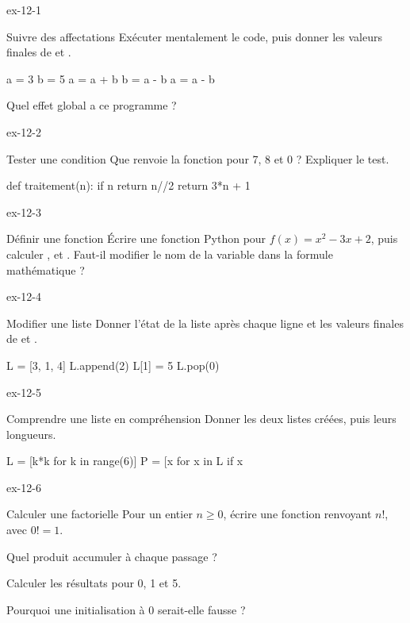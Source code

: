 \begin{blocLivre}{ex-12-1}
\begin{exercice}[1]{Suivre des affectations}
Exécuter mentalement le code, puis donner les valeurs finales de  et .
\begin{python}
a = 3
b = 5
a = a + b
b = a - b
a = a - b
\end{python}
Quel effet global a ce programme ?
\end{exercice}
\end{blocLivre}
\begin{blocLivre}{ex-12-2}
\begin{exercice}[1]{Tester une condition}
Que renvoie la fonction pour 7, 8 et 0 ? Expliquer le test.
\begin{python}
def traitement(n):
    if n %
        return n//2
    return 3*n + 1
\end{python}
\end{exercice}
\end{blocLivre}
\begin{blocLivre}{ex-12-3}
\begin{exercice}[1]{Définir une fonction}
Écrire une fonction Python pour $f(x)=x^2-3x+2$, puis calculer ,  et . Faut-il modifier le nom de la variable dans la formule mathématique ?
\end{exercice}
\end{blocLivre}
\begin{blocLivre}{ex-12-4}
\begin{exercice}[1]{Modifier une liste}
Donner l'état de la liste après chaque ligne et les valeurs finales de  et .
\begin{python}
L = [3, 1, 4]
L.append(2)
L[1] = 5
L.pop(0)
\end{python}
\end{exercice}
\end{blocLivre}
\begin{blocLivre}{ex-12-5}
\begin{exercice}[1]{Comprendre une liste en compréhension}
Donner les deux listes créées, puis leurs longueurs.
\begin{python}
L = [k*k for k in range(6)]
P = [x for x in L if x %
\end{python}
\end{exercice}
\end{blocLivre}
\clearpage
{}
\begin{blocLivre}{ex-12-6}
\begin{exercice}[2]{Calculer une factorielle}
Pour un entier $n\geq0$, écrire une fonction renvoyant $n!$, avec $0!=1$.\begin{questions}
\item Quel produit accumuler à chaque passage ?
\item Calculer les résultats pour 0, 1 et 5.
\item Pourquoi une initialisation à 0 serait-elle fausse ?
\end{questions}
\end{exercice}
\end{blocLivre}
